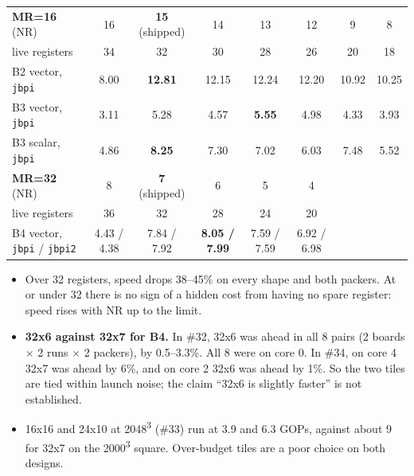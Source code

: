 \documentclass[10pt,a4paper]{article}
\begin{document}
\begin{center}\small
\begin{tabular}{@{}l c c c c c c c@{}}
\toprule
\textbf{MR=16} (NR) & 16 & \textbf{15} (shipped) & 14 & 13 & 12 & 9 & 8 \\
live registers & \cellcolor{red!12}34 & 32 & 30 & 28 & 26 & 20 & 18 \\
\midrule
B2 vector, \texttt{jbpi} & \cellcolor{red!12}8.00 & \textbf{12.81} & 12.15 & 12.24 & 12.20 & 10.92 & 10.25 \\
B3 vector, \texttt{jbpi} & \cellcolor{red!12}3.11 & 5.28 & 4.57 & \textbf{5.55} & 4.98 & 4.33 & 3.93 \\
B3 scalar, \texttt{jbpi} & \cellcolor{red!12}4.86 & \textbf{8.25} & 7.30 & 7.02 & 6.03 & 7.48 & 5.52 \\
\midrule
\textbf{MR=32} (NR) & 8 & \textbf{7} (shipped) & 6 & 5 & 4 & & \\
live registers & \cellcolor{red!12}36 & 32 & 28 & 24 & 20 & & \\
\midrule
B4 vector, \texttt{jbpi} / \texttt{jbpi2} & \cellcolor{red!12}4.43 / 4.38 & 7.84 / 7.92 & \textbf{8.05 / 7.99} & 7.59 / 7.59 & 6.92 / 6.98 & & \\
\bottomrule
\end{tabular}
\end{center}

\begin{itemize}
  \item Over 32 registers, speed drops 38--45\% on every shape and both packers. At or under 32 there
  is no sign of a hidden cost from having no spare register: speed rises with NR up to the limit.
  \item \textbf{32x6 against 32x7 for B4.} In \#32, 32x6 was ahead in all 8 pairs (2 boards $\times$
  2 runs $\times$ 2 packers), by 0.5--3.3\%. All 8 were on core 0. In \#34, on core 4 32x7 was ahead
  by 6\%, and on core 2 32x6 was ahead by 1\%. So the two tiles are tied within launch noise; the
  claim ``32x6 is slightly faster'' is not established.
  \item 16x16 and 24x10 at 2048\textsuperscript{3} (\#33) run at 3.9 and 6.3 GOPs, against about 9
  for 32x7 on the 2000\textsuperscript{3} square. Over-budget tiles are a poor choice on both designs.
\end{itemize}
\end{document}
